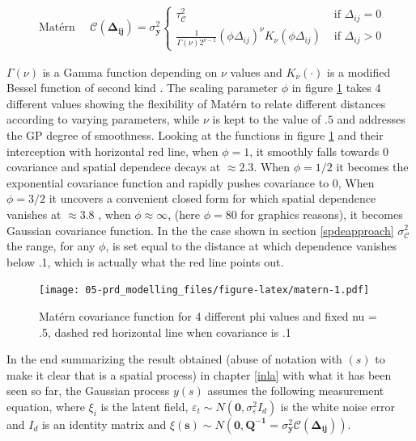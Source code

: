 \documentclass[
  12pt,
  a4paper,
  oneside]{book}
\theoremstyle{definition}
\theoremstyle{definition}
\theoremstyle{definition}
\theoremstyle{remark}
\begin{document}
\[
\begin{aligned}
\text { Matérn } \quad \mathscr{C}(\mathbf{ \Delta_{i j}})= \sigma_{\mathscr{\boldsymbol{\mathbf{y}}}}^{2} \left\{\begin{array}{cl}
\tau^{2}_{\mathscr{C}} & \text { if } \Delta_{i j}=0 \\
\frac{1}{\Gamma(\nu) 2^{\nu-1}}\left(\phi \Delta_{i j}\right)^{\nu} K_{\nu}\left(\phi \Delta_{i j}\right)& \text { if } \Delta_{i j}>0
\end{array}\right.
\end{aligned}
\]

\(\Gamma(\nu)\) is a Gamma function depending on \(\nu\) values and \(K_{\nu}(\cdot)\) is a modified Bessel function of second kind \citep{yaşar2016unified}. The scaling parameter \(\phi\) in figure \ref{fig:matern} takes 4 different values showing the flexibility of Matérn to relate different distances according to varying parameters, while \(\nu\) is kept to the value of \(.5\) and addresses the GP degree of smoothness.
Looking at the functions in figure \ref{fig:matern} and their interception with horizontal red line, when \(\phi = 1\), it smoothly falls towards 0 covariance and spatial dependece decays at \(\approx 2.3\). When \(\phi = 1/2\) it becomes the exponential covariance function and rapidly pushes covariance to 0, When \(\phi = 3/2\) it uncovers a convenient closed form for which spatial dependence vanishes at \(\approx 3.8\) \citep{LecturePaci}, when \(\phi \approx \infty\), (here \(\phi = 80\) for graphics reasons), it becomes Gaussian covariance function. In the the case shown in section \ref{spdeapproach} \(\sigma_{\mathscr{C}}^{2}\) the range, for any \(\phi\), is set equal to the distance at which dependence vanishes below .1, which is actually what the red line points out.

\begin{figure}
\centering
\texttt{[image: 05-prd\_modelling\_files/figure-latex/matern-1.pdf]}
\caption{\label{fig:matern}Matérn covariance function for 4 different phi values and fixed nu = .5, dashed red horizontal line when covariance is .1}
\end{figure}

In the end summarizing the result obtained (abuse of notation with \((s)\) to make it clear that is a spatial process) in chapter \ref{inla} with what it has been seen so far, the Gaussian process \(y(s)\) assumes the following measurement equation, where \(\xi_{i}\) is the latent field, \(\varepsilon_{t} \sim N\left(\mathbf{0}, \sigma_{\varepsilon}^{2} I_{d}\right)\) is the white noise error and \(I_{d}\) is an identity matrix and \(\xi(\boldsymbol{s})\sim N\left(\mathbf{0}, \boldsymbol{Q^{-1}}=\sigma_{\mathbf{y}}^{2} \mathscr{C}(\mathbf{ \Delta_{i j}})\right)\).
\end{document}
